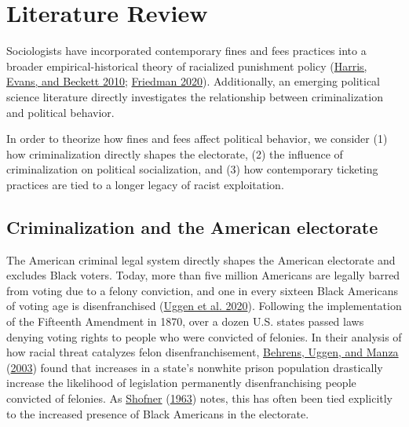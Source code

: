 \documentclass[
  12pt,
]{article}
\begin{document}
\hypertarget{literature-review}{%
\section*{Literature Review}\label{literature-review}}

Sociologists have incorporated contemporary fines and fees practices into a broader empirical-historical theory of racialized punishment policy (\protect\hyperlink{ref-Harris2010}{Harris, Evans, and Beckett 2010}; \protect\hyperlink{ref-Friedman2020}{Friedman 2020}). Additionally, an emerging political science literature directly investigates the relationship between criminalization and political behavior.

In order to theorize how fines and fees affect political behavior, we consider (1) how criminalization directly shapes the electorate, (2) the influence of criminalization on political socialization, and (3) how contemporary ticketing practices are tied to a longer legacy of racist exploitation.

\hypertarget{criminalization-and-the-american-electorate}{%
\subsection*{Criminalization and the American electorate}\label{criminalization-and-the-american-electorate}}

The American criminal legal system directly shapes the American electorate and excludes Black voters. Today, more than five million Americans are legally barred from voting due to a felony conviction, and one in every sixteen Black Americans of voting age is disenfranchised (\protect\hyperlink{ref-Uggen2020}{Uggen et al. 2020}). Following the implementation of the Fifteenth Amendment in 1870, over a dozen U.S. states passed laws denying voting rights to people who were convicted of felonies. In their analysis of how racial threat catalyzes felon disenfranchisement, \protect\hyperlink{ref-Behrens2003}{Behrens, Uggen, and Manza} (\protect\hyperlink{ref-Behrens2003}{2003}) found that increases in a state's nonwhite prison population drastically increase the likelihood of legislation permanently disenfranchising people convicted of felonies. As \protect\hyperlink{ref-Shofner1963}{Shofner} (\protect\hyperlink{ref-Shofner1963}{1963}) notes, this has often been tied explicitly to the increased presence of Black Americans in the electorate.
\end{document}
